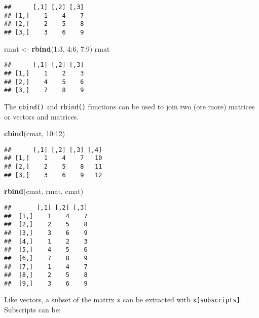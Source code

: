 \documentclass[]{book}
\newenvironment{Shaded}{\begin{snugshade}}{\end{snugshade}}
\newcommand{\KeywordTok}[1]{\textcolor[rgb]{0.13,0.29,0.53}{\textbf{{#1}}}}
\newcommand{\DecValTok}[1]{\textcolor[rgb]{0.00,0.00,0.81}{{#1}}}
\newcommand{\StringTok}[1]{\textcolor[rgb]{0.31,0.60,0.02}{{#1}}}
\newcommand{\NormalTok}[1]{{#1}}
\begin{document}
\begin{verbatim}
##      [,1] [,2] [,3]
## [1,]    1    4    7
## [2,]    2    5    8
## [3,]    3    6    9
\end{verbatim}

\begin{Shaded}
\begin{Highlighting}[]
\NormalTok{rmat <-}\StringTok{ }\KeywordTok{rbind}\NormalTok{(}\DecValTok{1}\NormalTok{:}\DecValTok{3}\NormalTok{, }\DecValTok{4}\NormalTok{:}\DecValTok{6}\NormalTok{, }\DecValTok{7}\NormalTok{:}\DecValTok{9}\NormalTok{)}
\NormalTok{rmat}
\end{Highlighting}
\end{Shaded}

\begin{verbatim}
##      [,1] [,2] [,3]
## [1,]    1    2    3
## [2,]    4    5    6
## [3,]    7    8    9
\end{verbatim}

The \texttt{cbind()} and \texttt{rbind()} functions can be used to join
two (ore more) matrices or vectors and matrices.

\begin{Shaded}
\begin{Highlighting}[]
\KeywordTok{cbind}\NormalTok{(cmat, }\DecValTok{10}\NormalTok{:}\DecValTok{12}\NormalTok{)}
\end{Highlighting}
\end{Shaded}

\begin{verbatim}
##      [,1] [,2] [,3] [,4]
## [1,]    1    4    7   10
## [2,]    2    5    8   11
## [3,]    3    6    9   12
\end{verbatim}

\begin{Shaded}
\begin{Highlighting}[]
\KeywordTok{rbind}\NormalTok{(cmat, rmat, cmat)}
\end{Highlighting}
\end{Shaded}

\begin{verbatim}
##       [,1] [,2] [,3]
##  [1,]    1    4    7
##  [2,]    2    5    8
##  [3,]    3    6    9
##  [4,]    1    2    3
##  [5,]    4    5    6
##  [6,]    7    8    9
##  [7,]    1    4    7
##  [8,]    2    5    8
##  [9,]    3    6    9
\end{verbatim}

Like vectors, a subset of the matrix \texttt{x} can be extracted with
\texttt{x{[}subscripts{]}}. Subscripts can be:
\end{document}
